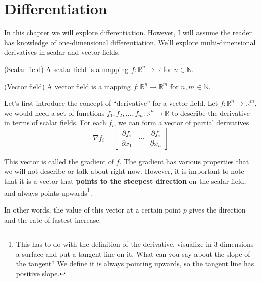 \documentclass[../linear-spaces.tex]{subfiles}
\begin{document}
\chapter{Differentiation}

In this chapter we will explore differentiation. However, I will assume the
reader has knowledge
of one-dimensional differentiation. We'll explore multi-dimensional derivatives
in scalar and vector fields.

\begin{definition} (Scalar field)
    A scalar field is a mapping $f:\mathbb{R}^{n} \to \mathbb{R}$ for $n\in
        \mathbb{N}$.
\end{definition}

\begin{definition} (Vector field)
    A vector field is a mapping $f:\mathbb{R}^{n} \to \mathbb{R}^{m}$ for
    $n,m\in \mathbb{N}$.
\end{definition}

Let's first introduce the concept of ``derivative'' for a vector field. Let $f:
    \mathbb{R}^{n} \to \mathbb{R}^{m}$,
we would need a set of functions $f_1,f_2,\dots,f_m: \mathbb{R}^{n} \to
    \mathbb{R}$ to describe the
derivative in terms of scalar fields. For each $f_i$, we can form a vector of
partial derivatives
\begin{equation*}
    \nabla f_i =
    \begin{bmatrix}
        \dfrac{\partial f_i}{\partial x_1} & \cdots & \dfrac{\partial
            f_i}{\partial x_n}
    \end{bmatrix}
\end{equation*}

This vector is called the gradient of $f$. The gradient has various properties
that we will not describe or talk about right now.
However, it is important to note that it is a vector that \textbf{points to the
    steepest direction} on the scalar field, and
always points upwards\footnote{This has to do with the definition of the
    derivative, visualize in 3-dimensions
    a surface and put a tangent line on it. What can you say about the slope of
    the tangent? We define it is always pointing upwards,
    so the tangent line has positive slope.}.

In other words, the value of this vector at a certain point $p$ gives the
direction and the rate of fastest increase.
\end{document}
